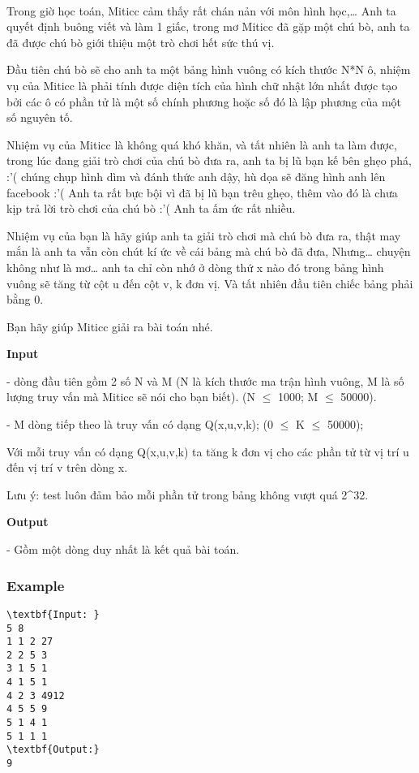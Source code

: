 

 

Trong giờ học toán, Miticc cảm thấy rất chán nản với môn hình học,… Anh ta quyết định buông viết và làm 1 giấc, trong mơ Miticc đã gặp một chú bò, anh ta đã được chú bò giới thiệu một trò chơi hết sức thú vị.

Đầu tiên chú bò sẽ cho anh ta một bảng hình vuông có kích thước N*N ô, nhiệm vụ của Miticc là phải tính được diện tích của hình chữ nhật lớn nhất được tạo bởi các ô có phần tử là một số chính phương hoặc số đó là lập phương của một số nguyên tố.

Nhiệm vụ của Miticc là không quá khó khăn, và tất nhiên là anh ta làm được, trong lúc đang giải trò chơi của chú bò đưa ra, anh ta bị lũ bạn kế bên ghẹo phá, :’( chúng chụp hình dìm và đánh thức anh dậy, hù dọa sẽ đăng hình anh lên facebook :’( Anh ta rất bực bội vì đã bị lũ bạn trêu ghẹo, thêm vào đó là chưa kịp trả lời trò chơi của chú bò :’( Anh ta ấm ức rất nhiều.

Nhiệm vụ của bạn là hãy giúp anh ta giải trò chơi mà chú bò đưa ra, thật may mắn là anh ta vẫn còn chút kí ức về cái bảng mà chú bò đã đưa, Nhưng… chuyện không như là mơ… anh ta chỉ còn nhớ ở dòng thứ x nào đó trong bảng hình vuông sẽ tăng từ cột u đến cột v, k đơn vị. Và tất nhiên đầu tiên chiếc bảng phải bằng 0.

Bạn hãy giúp Miticc giải ra bài toán nhé.

\textbf{Input }

- dòng đầu tiên gồm 2 số N và M (N là kích thước ma trận hình vuông, M là số lượng truy vấn mà Miticc sẽ nói cho bạn biết). (N $\le$ 1000; M $\le$ 50000).

- M dòng tiếp theo là truy vấn có dạng Q(x,u,v,k); (0 $\le$ K $\le$ 50000);

Với mỗi truy vấn có dạng Q(x,u,v,k) ta tăng k đơn vị cho các phần tử từ vị trí u đến vị trí v trên dòng x.

Lưu ý: test luôn đảm bảo mỗi phần tử trong bảng không vượt quá 2^32.

\textbf{Output }

- Gồm một dòng duy nhất là kết quả bài toán.

\subsubsection{Example}
\begin{verbatim}
\textbf{Input: }
5 8
1 1 2 27
2 2 5 3
3 1 5 1
4 1 5 1
4 2 3 4912
4 5 5 9
5 1 4 1
5 1 1 1
\textbf{Output:}
9\end{verbatim}
